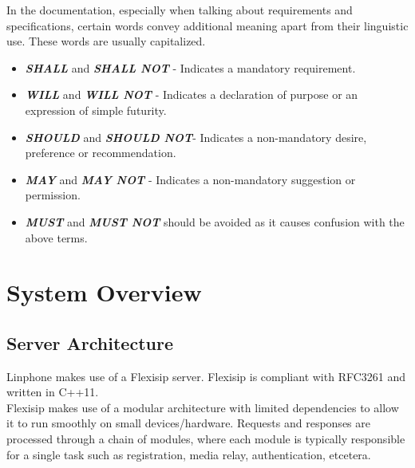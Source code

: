\documentclass[11pt]{article}
\begin{document}
In the documentation, especially when talking about requirements and specifications, certain words convey additional meaning apart from their linguistic use. These words are usually capitalized.
\begin{itemize}
\item \textbf{\small \textit{SHALL}} and \textbf{\small \textit{SHALL NOT}} - Indicates a mandatory requirement.
\item \textbf{\small \textit{WILL}} and \textbf{\small \textit{WILL NOT}} - Indicates a declaration of purpose or an expression of simple futurity.
\item \textbf{\small \textit{SHOULD}} and \textbf{\small \textit{SHOULD NOT}}- Indicates a non-mandatory desire, preference or recommendation.
\item \textbf{\small \textit{MAY}} and \textbf{\small \textit{MAY NOT}} - Indicates a non-mandatory suggestion or permission.
\item \textbf{\small \textit{MUST}} and \textbf{\small \textit{MUST NOT}} should be avoided as it causes confusion with the above terms. 
\end{itemize}

\section{System Overview}
\subsection{Server Architecture}
Linphone makes use of a Flexisip server. Flexisip is compliant with RFC3261 and written in C++11.\\

Flexisip makes use of a modular architecture with limited dependencies to allow it to run smoothly on small devices/hardware. Requests and responses are processed through a chain of modules, where each module is typically responsible for a single task such as registration, media relay, authentication, etcetera. \\
\end{document}
